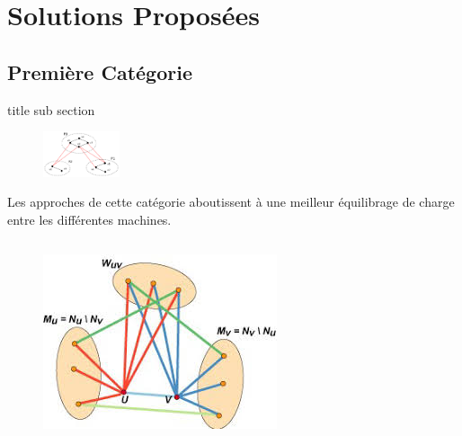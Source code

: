 \section{Solutions Proposées}
\subsection{Première Catégorie}
\begin{frame}{title sub section}
\begin{figure}
	\vspace{-35pt}
	\begin{center}
		\includegraphics[width=0.2\textwidth]{resources/partitions}
	\end{center}
	\vspace{-35pt}
	\end{figure}
       Les approches de cette catégorie aboutissent à une meilleur équilibrage de charge entre les différentes machines.
		\begin{columns}
      		\begin{column}{0.3\textwidth}
      			\begin{figure}
      				\centering
      				\includegraphics[width=\linewidth]{resources/transitions}
      			\end{figure}      			
      		\end{column}
      	

\end{columns}
\end{frame}
